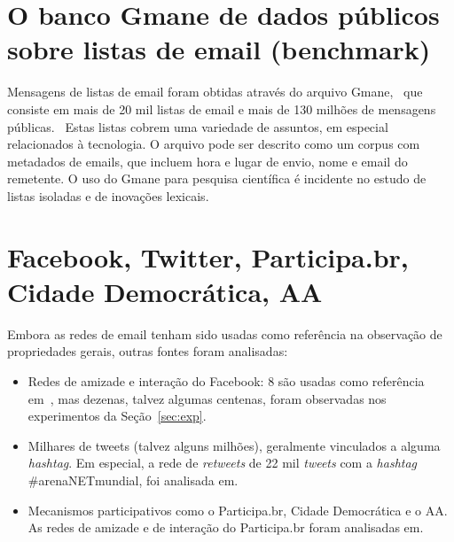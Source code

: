 \documentclass[a4paper,openright,12pt]{report} %
\begin{document}
\section{O banco Gmane de dados públicos sobre listas de email (benchmark)}
Mensagens de listas de email foram obtidas através do arquivo Gmane,~\cite{gmanePack}
que consiste em mais de 20 mil listas de email e mais de 130 milhões de mensagens públicas.~\cite{GMANEwikipedia}
Estas listas cobrem uma variedade de assuntos, em especial
relacionados à tecnologia. O arquivo pode ser descrito como
um corpus com metadados de emails, que incluem hora e lugar
de envio, nome e email do remetente. O uso do Gmane para
pesquisa científica é incidente no estudo de listas isoladas
e de inovações lexicais.~\cite{GMANE2,bird} 

\section{Facebook, Twitter, Participa.br, Cidade Democrática, AA}
Embora as redes de email tenham sido usadas como referência
na observação de propriedades gerais, outras fontes
foram analisadas:

\begin{itemize}
    \item Redes de amizade e interação do Facebook: 8 são usadas como referência em~\cite{timeS}, mas dezenas, talvez algumas centenas, foram observadas nos experimentos da Seção~\ref{sec:exp}.
    \item Milhares de tweets (talvez alguns milhões), geralmente vinculados a alguma \emph{hashtag}. Em especial, a rede de \emph{retweets} de 22 mil \emph{tweets} com a \emph{hashtag} \#arenaNETmundial, foi analisada em.~\cite{timeS}
    \item Mecanismos participativos como o Participa.br, Cidade Democrática e o AA. As redes de amizade e de interação do Participa.br foram analisadas em.~\cite{timeS}
\end{itemize}
\end{document}
